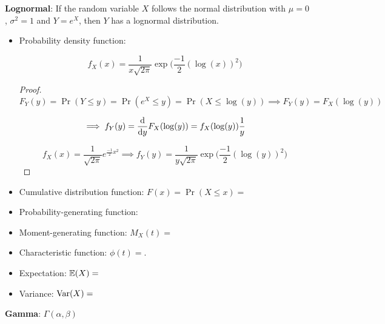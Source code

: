 \textbf{Lognormal}: If the random variable \(X\) follows the normal distribution with \(\mu = 0\), \(\sigma^2 = 1\) and \(Y = e^X\), then \(Y\) has a lognormal distribution.

\begin{itemize}

\item Probability density function:

\[
f_X(x) =\frac{1}{x \sqrt{2 \pi}} \exp\bigg(\frac{-1}{2}(\log(x))^2\bigg)
\]

\begin{proof}
\[
F_Y(y) = \Pr(Y \leq y) = \Pr(e^X \leq y) = \Pr(X \leq \log(y)) \implies F_Y(y) = F_X(\log(y))
\]

\[
\implies f_Y(y) = \deriv{}{y} F_X(\log(y)) = f_X(\log(y))\frac{1}{y}
\]

\[
f_X(x) = \frac{1}{\sqrt{2\pi}}e^{\frac{-1}{2}x^2} \implies
f_Y(y) = \frac{1}{y \sqrt{2 \pi}} \exp\bigg(\frac{-1}{2}(\log(y))^2\bigg)
\]
\end{proof}

\item Cumulative distribution function: \(F(x) = \Pr(X \leq x) = \)

\item Probability-generating function:

\item Moment-generating function: \(M_X(t) =\)

\item Characteristic function: \(\phi(t) = \).

\item Expectation: \(\E(X) = \)

\item Variance: \(\Var(X) = \)

\end{itemize}




\textbf{Gamma}: \(\Gamma(\alpha, \beta)\) 


